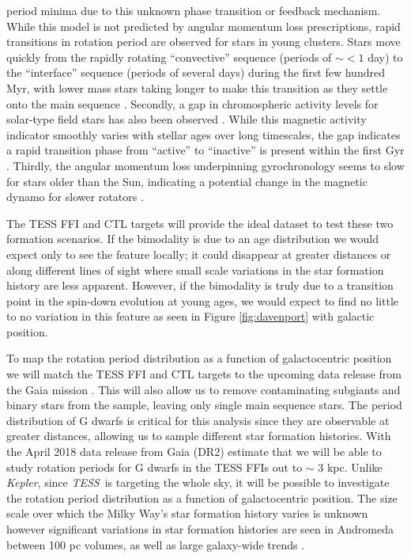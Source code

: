 \documentclass[useAMS, usenatbib, preprint, 12pt]{aastex}
\newcommand{\Kepler}{{\it Kepler}}
\newcommand{\TESS}{{\it TESS}}
\newcommand{\eg}{{\it e.g.}}
\begin{document}
period minima due to this unknown phase transition or feedback mechanism.
While this model is not predicted by angular momentum loss prescriptions,
rapid transitions in rotation period are observed for stars in young clusters.
Stars move quickly from the rapidly rotating “convective” sequence (periods of
$\sim<1$ day) to the “interface” sequence (periods of several days) during the
first few hundred Myr, with lower mass stars taking longer to make this
transition as they settle onto the main sequence \citep{barnes2003}.
Secondly, a gap in chromospheric activity levels for solar-type field stars
has also been observed \citep{vaughan1980}.
While this magnetic activity indicator smoothly varies with stellar ages over
long timescales, the gap indicates a rapid transition phase from “active” to
“inactive” is present within the first Gyr \citep{pace2009}.
Thirdly, the angular momentum loss underpinning gyrochronology seems to slow
for stars older than the Sun, indicating a potential change in the magnetic
dynamo for slower rotators \citep{angus2015, van-saders2016}.

The TESS FFI and CTL targets will provide the ideal dataset to test these two
formation scenarios.
If the bimodality is due to an age distribution we would expect only to see
the feature locally; it could disappear at greater distances or along
different lines of sight where small scale variations in the star formation
history are less apparent.
However, if the bimodality is truly due to a transition point in the spin-down
evolution at young ages, we would expect to find no little to no variation in
this feature as seen in Figure \ref{fig:davenport} with galactic position.

To map the rotation period distribution as a function of galactocentric
position we will match the TESS FFI and CTL targets to the upcoming data
release from the Gaia mission \citep{perryman2001}.
This will also allow us to remove contaminating subgiants and binary stars
from the sample, leaving only single main sequence stars.
The period distribution of G dwarfs is critical for this analysis since they
are observable at greater distances, allowing us to sample different star
formation histories.
With the April 2018 data release from Gaia (DR2) estimate that we will be able
to study rotation periods for G dwarfs in the TESS FFIs out to $\sim$ 3 kpc.
Unlike \Kepler, since \TESS\ is targeting the whole sky, it will be possible
to investigate the rotation period distribution as a function of
galactocentric position.
The size scale over which the Milky Way’s star formation history varies is
unknown however significant variations in star formation histories are seen in
Andromeda between 100 pc volumes, as well as large galaxy-wide trends
\citep[\eg][]{lewis2015}.
\end{document}
